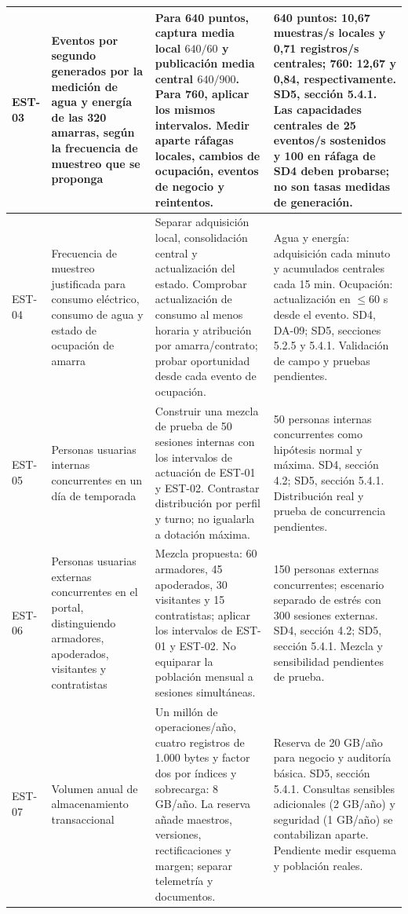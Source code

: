 \begin{longtable}{|L{0.075697\AnchoTablaAnexo}|L{0.270000\AnchoTablaAnexo}|L{0.340000\AnchoTablaAnexo}|L{0.314303\AnchoTablaAnexo}|}
EST-03 & Eventos por segundo generados por la medición de agua y energía de las 320 amarras, según la frecuencia de muestreo que se proponga & Para 640 puntos, captura media local \(640/60\) y publicación media central \(640/900\). Para 760, aplicar los mismos intervalos. Medir aparte ráfagas locales, cambios de ocupación, eventos de negocio y reintentos. & 640 puntos: 10,67 muestras/s locales y 0,71 registros/s centrales; 760: 12,67 y 0,84, respectivamente. SD5, sección 5.4.1. Las capacidades centrales de 25 eventos/s sostenidos y 100 en ráfaga de SD4 deben probarse; no son tasas medidas de generación. \\ \hline
EST-04 & Frecuencia de muestreo justificada para consumo eléctrico, consumo de agua y estado de ocupación de amarra & Separar adquisición local, consolidación central y actualización del estado. Comprobar actualización de consumo al menos horaria y atribución por amarra/contrato; probar oportunidad desde cada evento de ocupación. & Agua y energía: adquisición cada minuto y acumulados centrales cada 15 min. Ocupación: actualización en \(\leq\)60 s desde el evento. SD4, DA-09; SD5, secciones 5.2.5 y 5.4.1. Validación de campo y pruebas pendientes. \\ \hline
{}
EST-05 & Personas usuarias internas concurrentes en un día de temporada & Construir una mezcla de prueba de 50 sesiones internas con los intervalos de actuación de EST-01 y EST-02. Contrastar distribución por perfil y turno; no igualarla a dotación máxima. & 50 personas internas concurrentes como hipótesis normal y máxima. SD4, sección 4.2; SD5, sección 5.4.1. Distribución real y prueba de concurrencia pendientes. \\ \hline
EST-06 & Personas usuarias externas concurrentes en el portal, distinguiendo armadores, apoderados, visitantes y contratistas & Mezcla propuesta: 60 armadores, 45 apoderados, 30 visitantes y 15 contratistas; aplicar los intervalos de EST-01 y EST-02. No equiparar la población mensual a sesiones simultáneas. & 150 personas externas concurrentes; escenario separado de estrés con 300 sesiones externas. SD4, sección 4.2; SD5, sección 5.4.1. Mezcla y sensibilidad pendientes de prueba. \\ \hline
{}
EST-07 & Volumen anual de almacenamiento transaccional & Un millón de operaciones/año, cuatro registros de 1.000 bytes y factor dos por índices y sobrecarga: 8 GB/año. La reserva añade maestros, versiones, rectificaciones y margen; separar telemetría y documentos. & Reserva de 20 GB/año para negocio y auditoría básica. SD5, sección 5.4.1. Consultas sensibles adicionales (2 GB/año) y seguridad (1 GB/año) se contabilizan aparte. Pendiente medir esquema y población reales. \\ \hline

\end{longtable}
